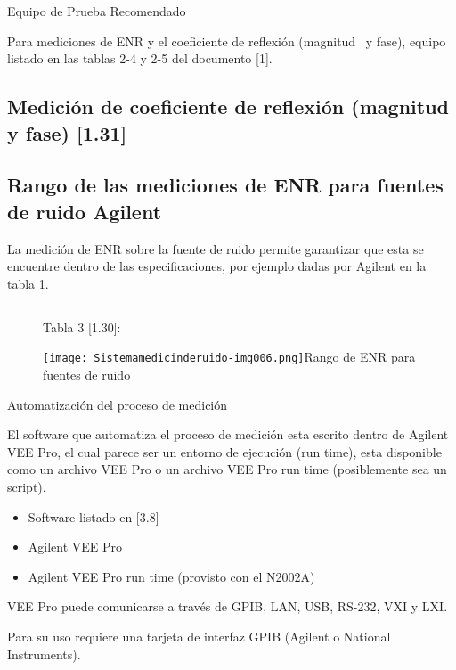 \documentclass[paper=letter,oneside,fontsize=10pt,parskip=full]{article}
\begin{document}
Equipo de Prueba Recomendado


\bigskip

Para mediciones de ENR y el coeficiente de reflexión (magnitud \ y fase), equipo listado en las tablas 2-4 y 2-5 del
documento [1].

\subsection{}
\subsection{Medición de coeficiente de reflexión (magnitud y fase) [1.31]}
\subsection{Rango de las mediciones de ENR para fuentes de ruido Agilent}
La medición de ENR sobre la fuente de ruido permite garantizar que esta se encuentre dentro de las especificaciones, por
ejemplo dadas por Agilent en la tabla 1.

\subsection[]{}
\begin{figure}
\centering
\begin{minipage}{5.29cm}
Tabla 3 [1.30]:

\texttt{[image: Sistemamedicinderuido-img006.png]}Rango de ENR para fuentes de ruido
\end{minipage}
\end{figure}
Automatización del proceso de medición

El software que automatiza el proceso de medición esta escrito dentro de Agilent VEE Pro, el cual parece ser un entorno
de ejecución (run time), esta disponible como un archivo VEE Pro o un archivo VEE Pro run time (posiblemente sea un
script). 

\begin{itemize}
\item Software listado en [3.8]
\item Agilent VEE Pro
\item Agilent VEE Pro run time (provisto con el N2002A)
\end{itemize}
VEE Pro puede comunicarse a través de GPIB, LAN, USB, RS-232, VXI y LXI.

Para su uso requiere una tarjeta de interfaz GPIB (Agilent o National Instruments).
\end{document}
